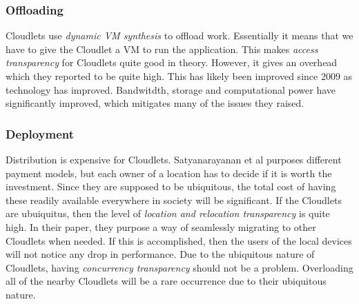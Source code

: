 \subsubsection{Offloading}
Cloudlets use \textit{dynamic VM synthesis} \cite{satyanarayanan_case_2009} to offload work. Essentially it means that we have to give the Cloudlet a VM to run the application. This makes \textit{access transparency} for Cloudlets quite good in theory. However, it gives an overhead which they reported to be quite high. This has likely been improved since 2009 as technology has improved. Bandwitdth, storage and computational power have significantly improved, which mitigates many of the issues they raised.
\subsubsection{Deployment}
Distribution is expensive for Cloudlets. Satyanarayanan et al\cite{satyanarayanan_case_2009} purposes different payment models, but each owner of a location has to decide if it is worth the investment. Since they are supposed to be ubiquitous, the total cost of having these readily available everywhere in society will be significant. If the Cloudlets are ubuiquitus, then the level of \textit{location and relocation transparency} is quite high. In their paper, they purpose a way of seamlessly migrating to other Cloudlets when needed. If this is accomplished, then the users of the local devices will not notice any drop in performance. Due to the ubiquitous nature of Cloudlets, having \textit{concurrency transparency} should not be a problem. Overloading all of the nearby Cloudlets will be a rare occurrence due to their ubiquitous nature.